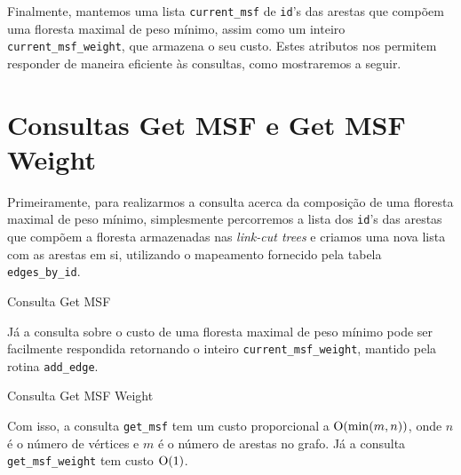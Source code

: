 Finalmente, mantemos uma lista \texttt{current\_msf} de \texttt{id}'s das arestas que compõem uma floresta maximal de peso mínimo, assim como um inteiro \texttt{current\_msf\_weight}, que armazena o seu custo. Estes atributos nos permitem responder de maneira eficiente às consultas, como mostraremos a seguir.

\section{Consultas Get MSF e Get MSF Weight}
\label{sec:imsf-get-msf}

Primeiramente, para realizarmos a consulta acerca da composição de uma floresta maximal de peso mínimo, simplesmente percorremos a lista dos \texttt{id}'s das arestas que compõem a floresta armazenadas nas \emph{link-cut trees} e criamos uma nova lista com as arestas em si, utilizando o mapeamento fornecido pela tabela \texttt{edges\_by\_id}.

\begin{algorithm}[h!]
    \caption{Consulta Get MSF}\label{imsf-get-msf}
    \begin{algorithmic}[1]
        \EndFor
        \State {}
        \EndFunction
    \end{algorithmic}
\end{algorithm}

Já a consulta sobre o custo de uma floresta maximal de peso mínimo pode ser facilmente respondida retornando o inteiro \texttt{current\_msf\_weight}, mantido pela rotina \texttt{add\_edge}.

\begin{algorithm}[h!]
    \caption{Consulta Get MSF Weight}\label{imsf-get-msf-weight}
    \begin{algorithmic}[1]
        \State {}
        \EndFunction
    \end{algorithmic}
\end{algorithm}

Com isso, a consulta \texttt{get\_msf} tem um custo proporcional a $\mathrm{O}(\min(m, n))$, onde $n$ é o número de vértices e $m$ é o número de arestas no grafo. Já a consulta \texttt{get\_msf\_weight} tem custo $\mathrm{O}(1)$.

